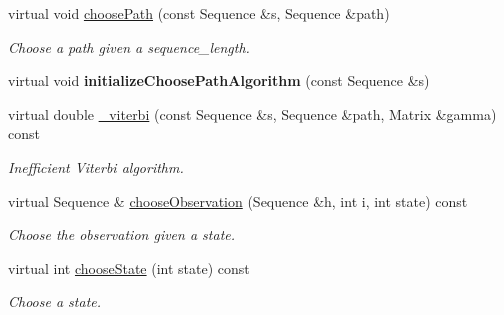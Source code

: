 \begin{DoxyCompactItemize}
virtual void \hyperlink{classtops_1_1GeneralizedHiddenMarkovModel_abb20e8b6109fb2e677a84c14a4cd4b1b}{choose\+Path} (const Sequence \&s, Sequence \&path)
\begin{DoxyCompactList}\small\item\em Choose a path given a sequence\+\_\+length. \end{DoxyCompactList}\item 
\mbox{\label{classtops_1_1GeneralizedHiddenMarkovModel_afb005c39b26f64015b8b00d86a992e61}} 
virtual void {\bfseries initialize\+Choose\+Path\+Algorithm} (const Sequence \&s)
\item 
\mbox{\label{classtops_1_1GeneralizedHiddenMarkovModel_a9cc86a386fb72dc574bc4ee990c48e1c}} 
virtual double \hyperlink{classtops_1_1GeneralizedHiddenMarkovModel_a9cc86a386fb72dc574bc4ee990c48e1c}{\+\_\+viterbi} (const Sequence \&s, Sequence \&path, Matrix \&gamma) const
\begin{DoxyCompactList}\small\item\em Inefficient Viterbi algorithm. \end{DoxyCompactList}\item 
\mbox{\label{classtops_1_1GeneralizedHiddenMarkovModel_a233bb11a876558c449713e274f0f7f6c}} 
virtual Sequence \& \hyperlink{classtops_1_1GeneralizedHiddenMarkovModel_a233bb11a876558c449713e274f0f7f6c}{choose\+Observation} (Sequence \&h, int i, int state) const
\begin{DoxyCompactList}\small\item\em Choose the observation given a state. \end{DoxyCompactList}\item 
\mbox{\label{classtops_1_1GeneralizedHiddenMarkovModel_ab7eb7993934b64eec491e956f9901b51}} 
virtual int \hyperlink{classtops_1_1GeneralizedHiddenMarkovModel_ab7eb7993934b64eec491e956f9901b51}{choose\+State} (int state) const
\begin{DoxyCompactList}\small\item\em Choose a state. \end{DoxyCompactList}\item 
\mbox{\label{classtops_1_1GeneralizedHiddenMarkovModel_ae42041710ca7d90aeddfa139225a61fa}} 

\end{DoxyCompactItemize}
